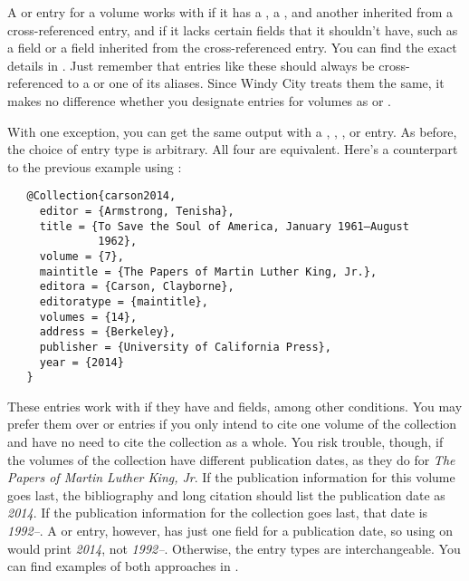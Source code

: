 \documentclass[11pt,letterpaper,oneside]{article}
\begin{document}
A  or  entry for a volume works
with  if it has a , a ,
and another  inherited from a cross-referenced entry,
and if it lacks certain fields that it shouldn't have, such as a
 field or a  field inherited from
the cross-referenced entry. You can find the exact details in
. Just remember that entries like these should
always be cross-referenced to a  or one of its
aliases. Since Windy City treats them the same, it makes no difference
whether you designate entries for volumes as  or
.

With one exception, you can get the same output with a ,
, , or 
entry. As before, the choice of entry type is arbitrary. All four are
equivalent. Here's a counterpart to the previous example using
:

\begin{verbatim}
   @Collection{carson2014,
     editor = {Armstrong, Tenisha},
     title = {To Save the Soul of America, January 1961–August
              1962},
     volume = {7},
     maintitle = {The Papers of Martin Luther King, Jr.},
     editora = {Carson, Clayborne},
     editoratype = {maintitle},
     volumes = {14},
     address = {Berkeley},
     publisher = {University of California Press},
     year = {2014}
   }
\end{verbatim}

These entries work with  if they have 
and  fields, among other conditions. You may
prefer them over  or  entries if
you only intend to cite one volume of the collection and have no need
to cite the collection as a whole. You risk trouble, though, if the
volumes of the collection have different publication dates, as they do
for \textit{The Papers of Martin Luther King, Jr}. If the publication
information for this volume goes last, the bibliography and long
citation should list the publication date as \textit{2014}. If the
publication information for the collection goes last, that date is
\textit{1992–}. A  or  entry,
however, has just one field for a publication date, so using
 on  would print \textit{2014}, not
\textit{1992–}. Otherwise, the entry types are interchangeable. You
can find examples of both approaches in .
\end{document}

